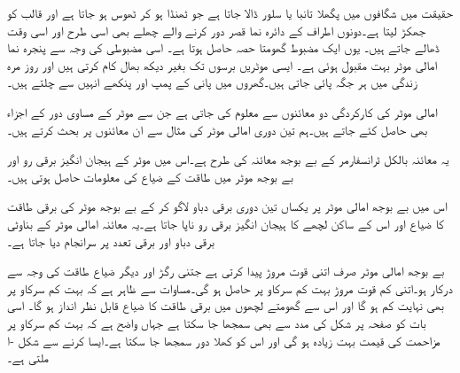 حقیقت میں شگافوں میں پگھلا تانبا یا سلور  ڈالا جاتا ہے جو ٹھنڈا ہو کر ٹھوس ہو جاتا ہے اور قالب کو جھکڑ لیتا ہے۔دونوں اطراف کے دائرہ نما قصر دور کرنے والے چھلے بھی اسی طرح اور اسی وقت ڈھالے جاتے ہیں۔  یوں ایک مضبوط گھومتا حصہ حاصل ہوتا ہے۔ اسی مضبوطی کی وجہ سے  پنجرہ نما امالی موٹر بہت مقبول ہوئی ہے۔ ایسی موٹریں  برسوں  تک بغیر دیکھ بھال  کام کرتی ہیں اور روز مرہ  زندگی میں ہر جگہ پائی جاتی ہیں۔گھروں میں پانی کے پمپ اور پنکھے انہیں سے چلتے ہیں۔

امالی موٹر کی کارکردگی دو معائنوں سے معلوم کی جاتی ہے جن سے موٹر کے مساوی  دور کے اجزاء  بھی حاصل کئے جاتے ہیں۔ہم تین دوری امالی موٹر کی مثال سے ان معائنوں پر بحث کرتے ہیں۔

یہ معائنہ بالکل ٹرانسفارمر کے بے بوجھ معائنہ کی طرح ہے۔اس میں موٹر کے ہیجان انگیز برقی رو اور بے بوجھ موٹر میں طاقت کے ضیاع کی معلومات حاصل ہوتی ہیں۔ 

اس میں  بے بوجھ امالی موٹر پر یکساں تین دوری  برقی دباو  لاگو کر کے بے بوجھ موٹر کی برقی طاقت کا ضیاع  اور اس کے ساکن لچھے  کا ہیجان انگیز برقی رو  ناپا جاتا ہے۔یہ معائنہ امالی موٹر کے بناوٹی برقی دباو اور برقی تعدد پر سرانجام دیا جاتا ہے۔

بے بوجھ امالی موٹر صرف اتنی قوت مروڑ پیدا کرتی ہے جتنی رگڑ اور دیگر ضیاع طاقت کی وجہ سے درکار ہو۔اتنی کم قوت مروڑ بہت کم سرکاو پر حاصل ہو گی۔مساوات   سے ظاہر ہے کہ بہت کم سرکاو پر   بھی نہایت کم ہو گا  اور اس سے گھومتے لچھوں میں برقی طاقت کا ضیاع قابل نظر انداز ہو گا۔ اسی بات کو صفحہ  پر شکل   کی مدد سے بھی سمجھا جا سکتا ہے جہاں  واضح ہے کہ بہت کم سرکاو پر مزاحمت  کی قیمت بہت زیادہ ہو گی اور اس کو کھلا دور سمجھا جا سکتا ہے۔ایسا کرنے سے شکل -ا ملتی ہے۔

